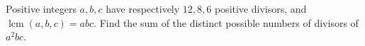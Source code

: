 Positive integers $a,b,c$ have respectively $12,8,6$ positive divisors, and $\operatorname{lcm}(a,b,c)=abc$. Find the sum of the distinct possible numbers of divisors of $a^2bc$.
